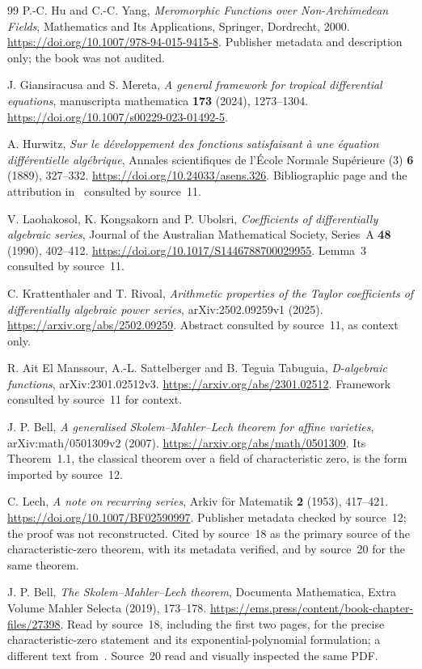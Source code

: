 \documentclass[11pt]{article}
\numberwithin{equation}{section}
\theoremstyle{definition}
\theoremstyle{remark}
\begin{document}
\begin{thebibliography}{99}
P.-C. Hu and C.-C. Yang,
\emph{Meromorphic Functions over Non-Archimedean Fields},
Mathematics and Its Applications, Springer, Dordrecht, 2000.
\url{https://doi.org/10.1007/978-94-015-9415-8}.
Publisher metadata and description only; the book was not audited.

J. Giansiracusa and S. Mereta,
\emph{A general framework for tropical differential equations},
manuscripta mathematica \textbf{173} (2024), 1273--1304.
\url{https://doi.org/10.1007/s00229-023-01492-5}.

A. Hurwitz,
\emph{Sur le d\'eveloppement des fonctions satisfaisant \`a une \'equation
diff\'erentielle alg\'ebrique},
Annales scientifiques de l'\'Ecole Normale Sup\'erieure (3) \textbf{6}
(1889), 327--332.
\url{https://doi.org/10.24033/asens.326}.
Bibliographic page and the attribution in~\cite{lku} consulted by source~11.

V. Laohakosol, K. Kongsakorn and P. Ubolsri,
\emph{Coefficients of differentially algebraic series},
Journal of the Australian Mathematical Society, Series~A \textbf{48} (1990),
402--412.
\url{https://doi.org/10.1017/S1446788700029955}.
Lemma~3 consulted by source~11.

C. Krattenthaler and T. Rivoal,
\emph{Arithmetic properties of the Taylor coefficients of differentially
algebraic power series}, arXiv:2502.09259v1 (2025).
\url{https://arxiv.org/abs/2502.09259}.
Abstract consulted by source~11, as context only.

R. Ait El Manssour, A.-L. Sattelberger and B. Teguia Tabuguia,
\emph{D-algebraic functions}, arXiv:2301.02512v3.
\url{https://arxiv.org/abs/2301.02512}.
Framework consulted by source~11 for context.

J. P. Bell,
\emph{A generalised Skolem--Mahler--Lech theorem for affine varieties},
arXiv:math/0501309v2 (2007).
\url{https://arxiv.org/abs/math/0501309}.
Its Theorem~1.1, the classical theorem over a field of characteristic zero,
is the form imported by source~12.

C. Lech,
\emph{A note on recurring series},
Arkiv f\"or Matematik \textbf{2} (1953), 417--421.
\url{https://doi.org/10.1007/BF02590997}.
Publisher metadata checked by source~12; the proof was not reconstructed.
Cited by source~18 as the primary source of the characteristic-zero theorem,
with its metadata verified, and by source~20 for the same theorem.

J. P. Bell,
\emph{The Skolem--Mahler--Lech theorem},
Documenta Mathematica, Extra Volume Mahler Selecta (2019), 173--178.
\url{https://ems.press/content/book-chapter-files/27398}.
Read by source~18, including the first two pages, for the precise
characteristic-zero statement and its exponential-polynomial formulation; a
different text from~\cite{bell}. Source~20 read and visually inspected the same
PDF.


\end{thebibliography}
\end{document}
